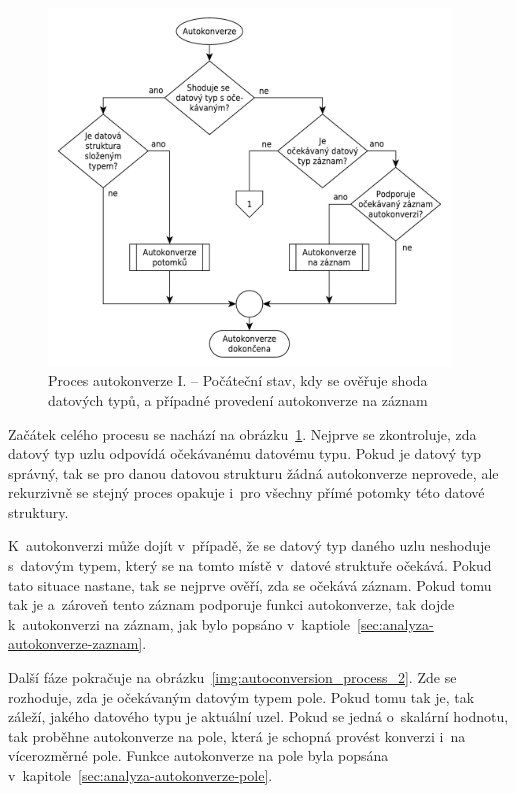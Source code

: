 \documentclass[FM,bw,DP]{tulthesis}
\begin{document}
\begin{figure}[h]
	\centering
    \includegraphics[width=0.95\textwidth]{../img/autoconversion_process.pdf}
    \caption[Proces autokonverze I.]{Proces autokonverze I. -- Počáteční stav, kdy se ověřuje shoda datových typů, a případné provedení autokonverze na záznam}
	\label{img:autoconversion_process}
\end{figure}

Začátek celého procesu se nachází na obrázku~\ref{img:autoconversion_process}.  Nejprve se zkontroluje, zda datový typ uzlu odpovídá očekávanému datovému typu. Pokud je datový typ správný, tak se pro danou datovou strukturu žádná autokonverze neprovede, ale rekurzivně se stejný proces opakuje i~pro všechny přímé potomky této datové struktury.

K~autokonverzi může dojít v~případě, že se datový typ daného uzlu neshoduje s~datovým typem, který se na tomto místě v~datové struktuře očekává. Pokud tato situace nastane, tak se nejprve ověří, zda se očekává záznam. Pokud tomu tak je a~zároveň tento záznam podporuje funkci autokonverze, tak dojde k~autokonverzi na záznam, jak bylo popsáno v~kaptiole~\ref{sec:analyza-autokonverze-zaznam}.

Další fáze pokračuje na obrázku~\ref{img:autoconversion_process_2}. Zde se rozhoduje, zda je očekávaným datovým typem pole. Pokud tomu tak je, tak záleží, jakého datového typu je aktuální uzel. Pokud se jedná o~skalární hodnotu, tak proběhne autokonverze na pole, která je schopná provést konverzi i~na vícerozměrné pole. Funkce autokonverze na pole byla popsána v~kapitole~\ref{sec:analyza-autokonverze-pole}.
\end{document}
